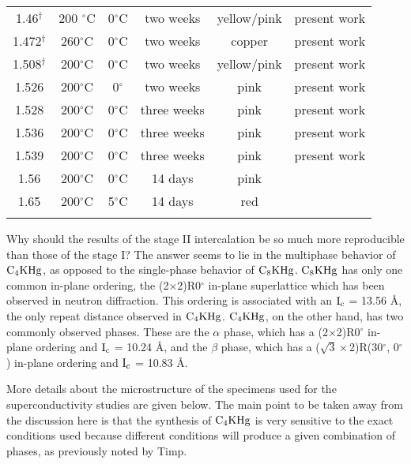 \begin{table}
\begin{center}
\begin{tabular}{||c|c|c|c|c|c||}
1.46$^{\dagger}$ & 200 $^{\circ}$C & 0$^{\circ}$C  & two weeks  & yellow/pink & present work \\	%
1.472$^{\dagger}$ &260$^{\circ}$C & 0$^{\circ}$C  & two weeks & copper & present work\\	%
1.508$^{\dagger}$ & 200$^{\circ}$C  & 0$^{\circ}$C  & two weeks & yellow/pink & present work \\   %
1.526 & 200$^{\circ}$C  & 0$^{\circ}$ & two weeks & pink & present work\\	%
1.528 & 200$^{\circ}$C  & 0$^{\circ}$C  & three weeks & pink & present work \\	%
1.536 & 200$^{\circ}$C & 0$^{\circ}$C  & three weeks & pink & present work \\	%
1.539 & 200$^{\circ}$C  & 0$^{\circ}$C  & three weeks & pink  & present work  \\	%
1.56 & 200$^{\circ}$C & 0$^{\circ}$C  & 14 days & pink & \cite{J140,timp83}\\
1.65 & 200$^{\circ}$C  & 5$^{\circ}$C & 14 days & red & \cite{J140,timp83}\\
& & & & & \\
\hline
\end{tabular}
\end{center}
\end{table}

        Why should the results  of  the stage II intercalation  be  so much
more  reproducible than those  of the stage I?   The answer seems to lie in
the multiphase behavior  of $\rm C_4KHg$,   as opposed to the  single-phase
behavior of  $\rm  C_8KHg$.   $\rm  C_8KHg$  has only  one  common in-plane
ordering, the (2$\times$2)R0$^{\circ}$ in-plane superlattice which has been
observed  in  neutron diffraction.\cite{kamitakahara84b}  This ordering  is
associated with an $\rm I_c$ = 13.56 \AA, the only repeat distance observed
in $\rm C_4KHg$.\cite{kamitakahara84b} $\rm C_4KHg$, on the other hand, has
two commonly observed phases.   These are  the $\alpha$ phase,  which has a
(2$\times$2)R0$^{\circ}$  in-plane ordering and  $\rm I_c$ = 10.24 \AA, and
the    $\beta$  phase, which   has   a   ($\sqrt{3}\times$2)R(30$^{\circ}$,
0$^{\circ}$)   in-plane    ordering     and    $\rm   I_c$        =   10.83
\AA.\cite{J140,kamitakahara84,K167}

        More details about the microstructure of the specimens used for the
superconductivity studies are given below.  The main point to be taken away
from the  discussion here  is that  the  synthesis of $\rm C_4KHg$  is very
sensitive to  the exact conditions used because  different  conditions will
produce a given combination of phases, as previously noted by Timp.\cite{J140}

